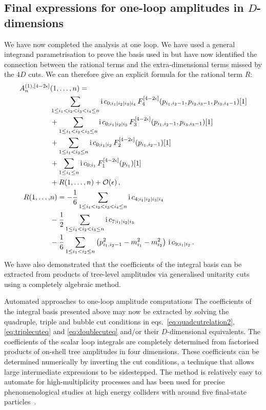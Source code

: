 \subsection{Final expressions for one-loop amplitudes in $D$-dimensions}

We have now completed the analysis at one loop. We have used a general integrand
parametrisation to prove the basis used in  but
have now identified the connection between the rational terms and the
extra-dimensional terms missed by the $4D$ cuts. We can therefore give an
explicit formula for the rational term $R$:
\begin{align}
  A^{(1),[4-2\epsilon]}_n&(1,\ldots,n) = \nonumber\\&
    \sum_{1\leq i_1<i_2<i_3<i_4\leq n} \mathrm{i} \, c_{0;i_1|i_2|i_3|i_4} \, F^{[4-2\epsilon]}_4(p_{i_1,i_2-1},p_{i_2,i_3-1},p_{i_3,i_4-1})[1]\nonumber\\&
  + \sum_{1\leq i_1<i_2<i_3\leq n} \mathrm{i} \, c_{0;i_1|i_2|i_3} \, F^{[4-2\epsilon]}_3(p_{i_1,i_2-1},p_{i_3,i_3-1})[1]\nonumber\\&
  + \sum_{1\leq i_1<i_2\leq n} \mathrm{i} \, c_{0;i_1|i_2} \, F^{[4-2\epsilon]}_2(p_{i_1,i_2-1})[1]\nonumber\\&
  + \sum_{1\leq i_1\leq n} \mathrm{i} \, c_{0;i_1} \, F^{[4-2\epsilon]}_1(p_{i_1})[1]\nonumber\\&
  + R(1,\ldots,n) + \mathcal{O}(\epsilon) \,,\\
  R(1,\ldots,&n) = 
  -\frac{1}{6} \sum_{1\leq i_1<i_2<i_3<i_4\leq n} \mathrm{i} \, c_{4;i_1|i_2|i_3|i_4} \nonumber\\&
  -\frac{1}{2} \sum_{1\leq i_1<i_2<i_3\leq n} \mathrm{i} \, c_{7;i_1|i_2|i_3} \nonumber\\&
  -\frac{1}{6} \sum_{1\leq i_1<i_2\leq n}  \left(p_{i_1,i_2-1}^2 - m_{i_1}^2 - m_{i_2}^2 \right) \, \mathrm{i} \, c_{9;i_1|i_2} \,.
\end{align}
We have also demonstrated that the coefficients of the integral basis can be
extracted from products of tree-level amplitudes via generalised unitarity
cuts using a completely algebraic method.

\begin{important}{Automated approaches to one-loop amplitude computations}
  The coefficients of the integral basis presented above may now be extracted
  by solving the quadruple, triple and bubble cut conditions in
  eqs.~\eqref{eq:quadcutrelation2}, \eqref{eq:triplecuteq} and
  \eqref{eq:doublecuteq} and/or their $D$-dimensional equivalents.
  The coefficients of the scalar loop integrals are completely determined from
  factorised products of on-shell tree amplitudes in four dimensions.
  These coefficients can be determined numerically by inverting the cut conditions,
  a technique that allows large intermediate expressions to be sidestepped.
  The method is relatively easy to automate for high-multiplicity processes and has been used for
  precise phenomenological studies at high energy colliders with around five
  final-state particles~\cite{ch3_Berger:2008sj,ch3_Giele:2008bc,ch3_Hirschi:2011pa,ch3_Bevilacqua:2011xh,ch3_Badger:2012pg,ch3_GoSam:2014iqq,ch3_Actis:2016mpe,ch3_Buccioni:2019sur}.
\end{important}

